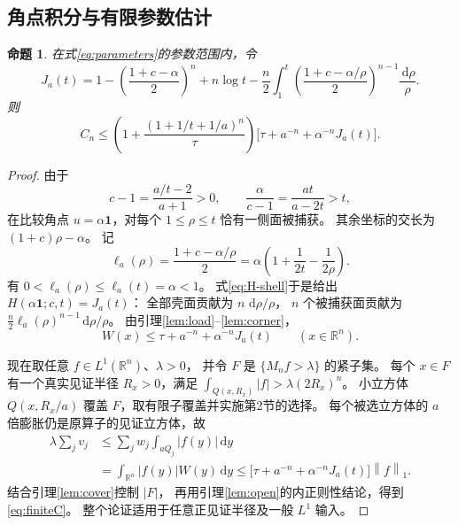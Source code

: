 \documentclass[UTF8,a4paper,11pt,fontset=fandol]{ctexart}
\newtheorem{proposition}[lemma]{命题}
\theoremstyle{remark}
\newcommand{\R}{\mathbb R}
\newcommand{\one}{\mathbf 1}
\newcommand{\norm}[1]{\left\lVert#1\right\rVert}
\newcommand{\dint}{\,\mathrm d}
\begin{document}
\subsection{角点积分与有限参数估计}
\begin{proposition}\label{prop:finite}
在式\eqref{eq:parameters}的参数范围内，令
\begin{equation}\label{eq:Ja}
 J_a(t)=1-\left(\frac{1+c-\alpha}{2}\right)^n+n\log t
 -\frac n2\int_1^t
       \left(\frac{1+c-\alpha/\rho}{2}\right)^{n-1}
                           \frac{\dint\rho}{\rho}.
\end{equation}
则
\begin{equation}\label{eq:finiteC}
 C_n\le
 \left(1+\frac{(1+1/t+1/a)^n}{\tau}\right)
 \bigl[\tau+a^{-n}+\alpha^{-n}J_a(t)\bigr].
\end{equation}
\end{proposition}
\begin{proof}
由于
\[
 c-1=\frac{a/t-2}{a+1}>0,\qquad
 \frac{\alpha}{c-1}=\frac{at}{a-2t}>t,
\]
在比较角点 $u=\alpha\one$，对每个 $1\le\rho\le t$
恰有一侧面被捕获。
其余坐标的交长为 $(1+c)\rho-\alpha$。
记
\[
 \ell_a(\rho)=\frac{1+c-\alpha/\rho}{2}
 =\alpha\left(1+\frac1{2t}-\frac1{2\rho}\right).
\]
有 $0<\ell_a(\rho)\le\ell_a(t)=\alpha<1$。
式\eqref{eq:H-shell}于是给出
$H(\alpha\one;c,t)=J_a(t)$：
全部壳面贡献为 $n\,\dint\rho/\rho$，
$n$ 个被捕获面贡献为
$\frac n2\ell_a(\rho)^{n-1}\dint\rho/\rho$。
由引理\ref{lem:load}--\ref{lem:corner}，
\[
 W(x)\le\tau+a^{-n}+\alpha^{-n}J_a(t)
 \qquad(x\in\R^n).
\]

现在取任意 $f\in L^1(\R^n)$、$\lambda>0$，
并令 $F$ 是 $\{M_nf>\lambda\}$ 的紧子集。
每个 $x\in F$ 有一个真实见证半径 $R_x>0$，满足
$\int_{Q(x,R_x)}|f|>\lambda(2R_x)^n$。
小立方体 $Q(x,R_x/a)$ 覆盖 $F$，取有限子覆盖并实施第2节的选择。
每个被选立方体的 $a$ 倍膨胀仍是原算子的见证立方体，故
\begin{align*}
 \lambda\sum_jv_j
 &\le\sum_jw_j\int_{aQ_j}|f(y)|\dint y\\
 &=\int_{\R^n}|f(y)|W(y)\dint y
 \le\bigl[\tau+a^{-n}+\alpha^{-n}J_a(t)\bigr]\norm f_1.
\end{align*}
结合引理\ref{lem:cover}控制 $|F|$，
再用引理\ref{lem:open}的内正则性结论，得到\eqref{eq:finiteC}。
整个论证适用于任意正见证半径及一般 $L^1$ 输入。
\end{proof}
\end{document}
